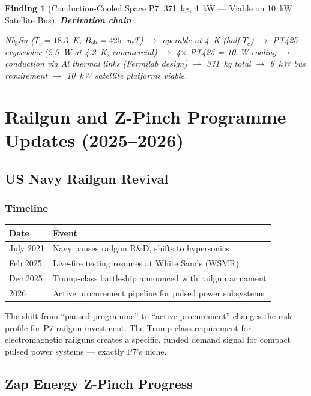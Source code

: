 \documentclass[11pt]{article}
\newtheorem{finding}{Finding}
\begin{document}
\begin{finding}[Conduction-Cooled Space P7: 371~kg, 4~kW --- Viable
on 10~kW Satellite Bus]
\textbf{Derivation chain}:
\begin{center}
Nb$_3$Sn ($T_c = 18.3$~K, $B_{\rm sh} = 425$~mT) $\to$ operable
at 4~K (half-$T_c$) $\to$ PT425 cryocooler (2.5~W at 4.2~K,
commercial) $\to$ 4$\times$ PT425 = 10~W cooling $\to$ conduction
via Al thermal links (Fermilab design) $\to$ 371~kg total $\to$
6~kW bus requirement $\to$ 10~kW satellite platforms viable.
\end{center}
\end{finding}

\section{Railgun and Z-Pinch Programme Updates (2025--2026)}
\label{sec:programme-updates}

\subsection{US Navy Railgun Revival}

\subsubsection{Timeline}

\begin{center}
\begin{tabular}{ll}
\toprule
Date & Event \\
\midrule
July 2021 & Navy pauses railgun R\&D, shifts to hypersonics \\
Feb 2025 & Live-fire testing resumes at White Sands (WSMR) \\
Dec 2025 & Trump-class battleship announced with railgun armament \\
2026 & Active procurement pipeline for pulsed power subsystems \\
\bottomrule
\end{tabular}
\end{center}

The shift from ``paused programme'' to ``active procurement'' changes
the risk profile for P7 railgun investment. The Trump-class requirement
for electromagnetic railguns creates a specific, funded demand signal
for compact pulsed power systems --- exactly P7's niche.

\subsection{Zap Energy Z-Pinch Progress}
\end{document}
